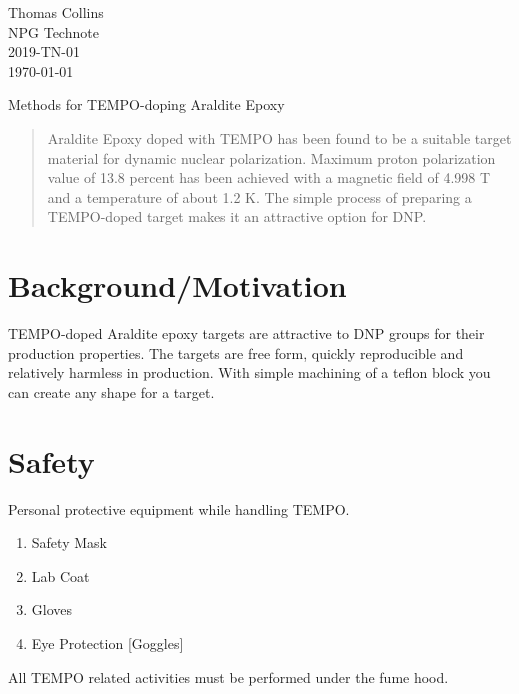 \documentclass[12pt,epsfig]{article}
\begin{document}
\pagestyle{empty}
\renewcommand{\thefootnote}{\fnsymbol{footnote}}

\begin{flushright}
{\small
Thomas Collins\\
NPG Technote \\ 
2019-TN-01\\
\today\\}
\end{flushright}

\vspace{.8cm}

\begin{center}
Methods for TEMPO-doping Araldite Epoxy\\   
\end{center}
\vspace{1cm}

\begin{abstract}
Araldite Epoxy doped with TEMPO has been found to be a suitable target material for dynamic nuclear polarization. Maximum proton polarization value of 13.8 percent has been achieved with a magnetic field of 4.998 T and a temperature of about 1.2 K. The simple process of preparing a TEMPO-doped target makes it an attractive option for DNP.      
\end{abstract}



\section{Background/Motivation}

TEMPO-doped Araldite epoxy targets are attractive to DNP groups for their production properties. The targets are free form, quickly reproducible and relatively harmless in production. With simple machining of a teflon block you can create any shape for a target.   

\section{Safety}
Personal protective equipment while handling TEMPO.
\begin{enumerate}
\item Safety Mask 
\item Lab Coat
\item Gloves 
\item Eye Protection [Goggles]
\end{enumerate}
All TEMPO related activities must be performed under the fume hood. 
\end{document}
